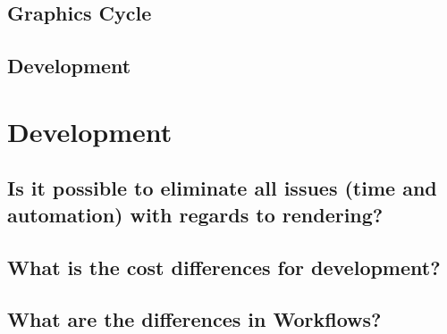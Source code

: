 \subsection{Graphics Cycle}
\subsection{Development}

\section{Development}

\subsection{Is it possible to eliminate all issues (time and automation) with regards to rendering?}

\subsection{What is the cost differences for development?}

\subsection{What are the differences in Workflows?}

